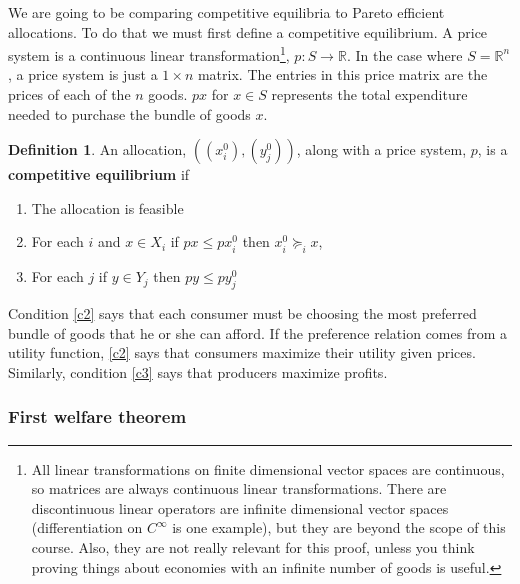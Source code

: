 \documentclass[12pt,reqno]{amsart}
\theoremstyle{definition}
\newtheorem{definition}{Definition}[section]
\def\R{\mathbb{R}}
\newcommand{\prefeq}{\succeq}
\begin{document}
We are going to be comparing competitive equilibria to Pareto
efficient allocations. To do that we must first define a competitive
equilibrium. A price system is a continuous linear
transformation\footnote{All linear transformations on finite
  dimensional vector spaces are continuous, so matrices are always
  continuous linear transformations. There are discontinuous linear
  operators are infinite dimensional vector spaces (differentiation on
  $C^\infty$ is one example), but they are beyond the scope of this
  course. Also, they are not really relevant for this proof, unless
  you think proving things about economies with an infinite number of
  goods is useful.}, $p:S \rightarrow \R$. In the case where $S =
\R^n$, a price system is just a $1 \times n$ matrix. The entries in
this price matrix are the prices of each of the $n$ goods. $px$ for $x
\in S$ represents the total expenditure needed to purchase the bundle
of goods $x$.
\begin{definition}
  An allocation, $((x_i^0),(y_j^0))$, along with a price system, $p$,
  is a \textbf{competitive equilibrium} if 
  \renewcommand{\theenumi}{C\arabic{enumi}}
  \begin{enumerate}
  \item\label{c1} The allocation is feasible
  \item\label{c2} For each $i$ and $x \in X_i$ if $px \leq px_i^0$
    then $x_i^0 \prefeq_i x$,
  \item\label{c3} For each $j$ if $y \in Y_j$ then $p y \leq p y_j^0$
  \end{enumerate}
  \renewcommand{\theenumi}{\roman{enumi}}
\end{definition}
Condition \ref{c2} says that each consumer must be choosing the most
preferred bundle of goods that he or she can afford. If the preference
relation comes from a utility function, \ref{c2} says that consumers
maximize their utility given prices. Similarly, condition \ref{c3}
says that producers maximize profits.

\subsubsection{First welfare theorem}
\end{document}

